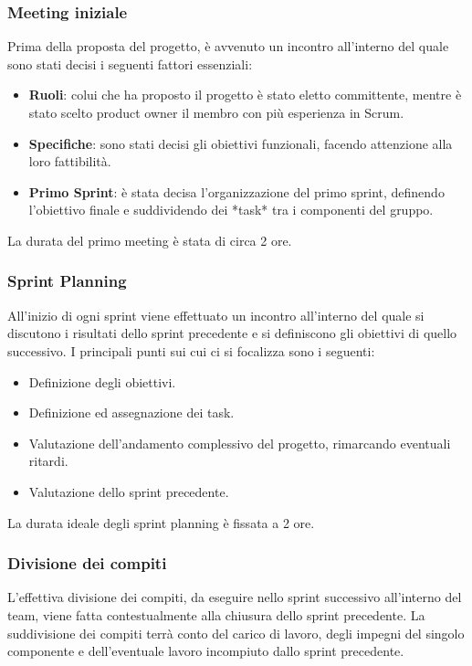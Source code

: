 \subsubsection{Meeting iniziale}
Prima della proposta del progetto, è avvenuto un incontro all'interno del quale sono stati decisi i seguenti fattori essenziali:
\begin{itemize}
    \item \textbf{Ruoli}: colui che ha proposto il progetto è stato eletto committente, mentre è stato scelto product owner il membro con più esperienza in Scrum.
    \item \textbf{Specifiche}: sono stati decisi gli obiettivi funzionali, facendo attenzione alla loro fattibilità.
    \item \textbf{Primo Sprint}: è stata decisa l'organizzazione del primo sprint, definendo l'obiettivo finale e suddividendo dei *task* tra i componenti del gruppo.
\end{itemize}
La durata del primo meeting è stata di circa 2 ore.

\subsubsection{Sprint Planning}
All'inizio di ogni sprint viene effettuato un incontro all'interno del quale si discutono i
risultati dello sprint precedente e si definiscono gli obiettivi di quello successivo.
I principali punti sui cui ci si focalizza sono i seguenti:
\begin{itemize}
    \item Definizione degli obiettivi.
    \item Definizione ed assegnazione dei task.
    \item Valutazione dell'andamento complessivo del progetto, rimarcando eventuali ritardi.
    \item Valutazione dello sprint precedente.
\end{itemize}

La durata ideale degli sprint planning è fissata a 2 ore.

\subsubsection{Divisione dei compiti}
L'effettiva divisione dei compiti, da eseguire nello sprint successivo all'interno del team, viene fatta
contestualmente alla chiusura dello sprint precedente. La suddivisione dei compiti terrà conto del carico di lavoro, degli
impegni del singolo componente e dell'eventuale lavoro incompiuto dallo sprint precedente.

